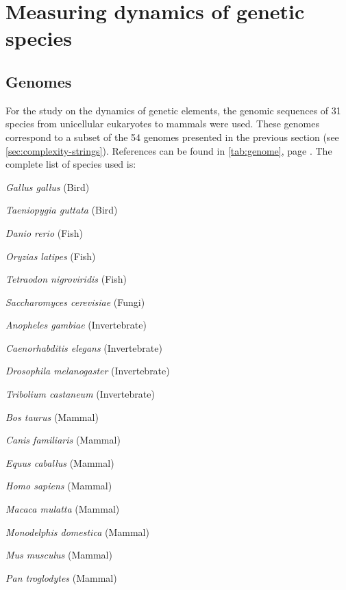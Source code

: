 \section{Measuring dynamics of genetic species}
\label{sec:meas-dynam-genet}

\subsection{Genomes}
\label{sec:genomes}

For the study on the dynamics of genetic elements, the genomic sequences of 31 species from unicellular eukaryotes to mammals were used. These genomes correspond to a subset of the 54 genomes presented in the previous section (see \autoref{sec:complexity-strings}). References can be found in \autoref{tab:genome}, page \pageref{tab:genome}. The complete list of species used is: \begin{inparaenum}[\bgroup\bfseries\em 1\egroup\it)]
\item \textit{Gallus gallus}            (Bird)
\item \textit{Taeniopygia guttata}      (Bird)
\item \textit{Danio rerio}              (Fish)
\item \textit{Oryzias latipes}          (Fish)
\item \textit{Tetraodon nigroviridis}   (Fish)
\item \textit{Saccharomyces cerevisiae} (Fungi)
\item \textit{Anopheles gambiae}        (Invertebrate)
\item \textit{Caenorhabditis elegans}   (Invertebrate)
\item \textit{Drosophila melanogaster}  (Invertebrate)
\item \textit{Tribolium castaneum}      (Invertebrate)
\item \textit{Bos taurus}               (Mammal)
\item \textit{Canis familiaris}         (Mammal)
\item \textit{Equus caballus}           (Mammal)
\item \textit{Homo sapiens}             (Mammal)
\item \textit{Macaca mulatta}           (Mammal)
\item \textit{Monodelphis domestica}    (Mammal)
\item \textit{Mus musculus}             (Mammal)
\item \textit{Pan troglodytes}          (Mammal)

\end{inparaenum}
